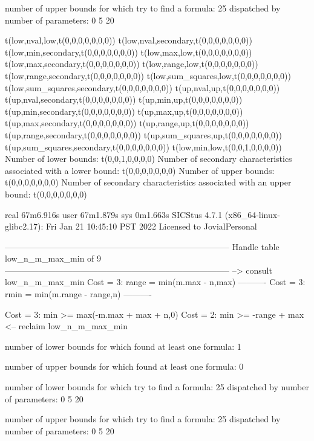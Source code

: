 number of upper bounds for which try to find a formula: 25
dispatched by number of parameters: 0  5  20

t(low,nval,low,t(0,0,0,0,0,0,0))
t(low,nval,secondary,t(0,0,0,0,0,0,0))
t(low,min,secondary,t(0,0,0,0,0,0,0))
t(low,max,low,t(0,0,0,0,0,0,0))
t(low,max,secondary,t(0,0,0,0,0,0,0))
t(low,range,low,t(0,0,0,0,0,0,0))
t(low,range,secondary,t(0,0,0,0,0,0,0))
t(low,sum_squares,low,t(0,0,0,0,0,0,0))
t(low,sum_squares,secondary,t(0,0,0,0,0,0,0))
t(up,nval,up,t(0,0,0,0,0,0,0))
t(up,nval,secondary,t(0,0,0,0,0,0,0))
t(up,min,up,t(0,0,0,0,0,0,0))
t(up,min,secondary,t(0,0,0,0,0,0,0))
t(up,max,up,t(0,0,0,0,0,0,0))
t(up,max,secondary,t(0,0,0,0,0,0,0))
t(up,range,up,t(0,0,0,0,0,0,0))
t(up,range,secondary,t(0,0,0,0,0,0,0))
t(up,sum_squares,up,t(0,0,0,0,0,0,0))
t(up,sum_squares,secondary,t(0,0,0,0,0,0,0))
t(low,min,low,t(0,0,1,0,0,0,0))
Number of lower bounds:                                             t(0,0,1,0,0,0,0)
Number of secondary characteristics associated with a lower bound:  t(0,0,0,0,0,0,0)
Number of upper bounds:                                             t(0,0,0,0,0,0,0)
Number of secondary characteristics associated with an upper bound: t(0,0,0,0,0,0,0)

real	67m6.916s
user	67m1.879s
sys	0m1.663s
SICStus 4.7.1 (x86_64-linux-glibc2.17): Fri Jan 21 10:45:10 PST 2022
Licensed to JovialPersonal


--------------------------------------------------------------------------------
Handle table low_n_m_max_min of 9
--------------------------------------------------------------------------------
--> consult low_n_m_max_min
Cost =  3:  range = min(m.max - n,max)
----------
Cost =  3:  rmin  = min(m.range - range,n)
----------

Cost =  3:  min >= max(-m.max + max + n,0)
Cost =  2:  min >= -range + max
<-- reclaim low_n_m_max_min

number of lower bounds for which found at least one formula: 1

number of upper bounds for which found at least one formula: 0

number of lower bounds for which try to find a formula: 25
dispatched by number of parameters: 0  5  20

number of upper bounds for which try to find a formula: 25
dispatched by number of parameters: 0  5  20

